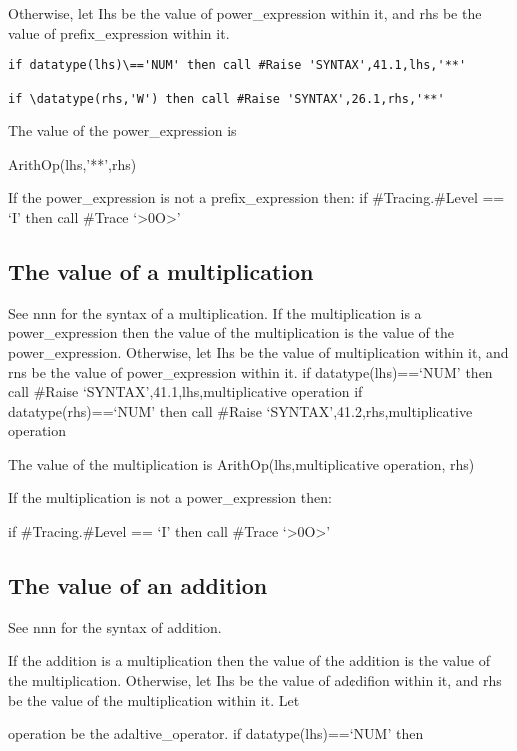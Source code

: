 Otherwise, let Ihs be the value of power\_expression within it, and rhs
be the value of prefix\_expression within it.

\begin{verbatim}
if datatype(lhs)\=='NUM' then call #Raise 'SYNTAX',41.1,lhs,'**'

if \datatype(rhs,'W') then call #Raise 'SYNTAX',26.1,rhs,'**'
\end{verbatim}

The value of the power\_expression is

ArithOp(lhs,'**',rhs)

If the power\_expression is not a prefix\_expression then: if
\#Tracing.\#Level == `I' then call \#Trace
`\textgreater0O\textgreater{}'

\hypertarget{the-value-of-a-multiplication}{%
\subsection{The value of a
multiplication}\label{the-value-of-a-multiplication}}

See nnn for the syntax of a multiplication. If the multiplication is a
power\_expression then the value of the multiplication is the value of
the power\_expression. Otherwise, let Ihs be the value of multiplication
within it, and rns be the value of power\_expression within it. if
datatype(lhs)==`NUM' then call \#Raise `SYNTAX',41.1,lhs,multiplicative
operation if datatype(rhs)==`NUM' then call \#Raise
`SYNTAX',41.2,rhs,multiplicative operation

The value of the multiplication is ArithOp(lhs,multiplicative operation,
rhs)

If the multiplication is not a power\_expression then:

if \#Tracing.\#Level == `I' then call \#Trace
`\textgreater0O\textgreater{}'

\hypertarget{the-value-of-an-addition}{%
\subsection{The value of an addition}\label{the-value-of-an-addition}}

See nnn for the syntax of addition.

If the addition is a multiplication then the value of the addition is
the value of the multiplication. Otherwise, let Ihs be the value of
ad¢difion within it, and rhs be the value of the multiplication within
it. Let

operation be the adaltive\_operator. if datatype(lhs)==`NUM' then


